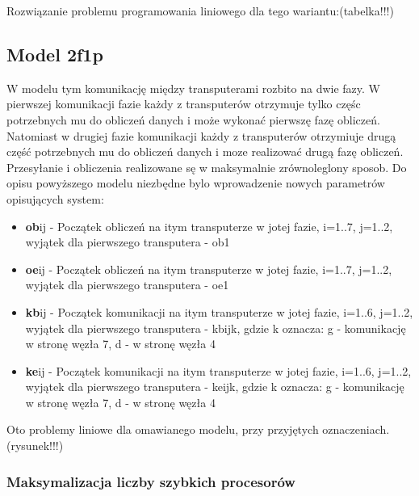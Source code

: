\documentclass[a4paper,11pt, titlepage]{article}
\begin{document}
Rozwiązanie problemu programowania liniowego dla tego wariantu:(tabelka!!!)

\subsection{Model 2f1p}
W modelu tym komunikację między transputerami rozbito na dwie fazy. W pierwszej komunikacji fazie każdy z transputerów otrzymuje tylko częśc potrzebnych mu do obliczeń danych i może wykonać pierwszę fazę obliczeń. Natomiast w drugiej fazie komunikacji każdy z transputerów otrzymiuje drugą część potrzebnych mu do obliczeń danych i moze realizować drugą fazę obliczeń. Przesyłanie i obliczenia realizowane sę w maksymalnie zrównoleglony sposob. 
Do opisu powyższego modelu niezbędne bylo wprowadzenie nowych parametrów opisujących system:
\begin{itemize}
\item \textbf{ob}ij - Początek obliczeń na itym transputerze w jotej fazie, i=1..7, j=1..2, wyjątek dla pierwszego transputera - ob1
\item \textbf{oe}ij - Początek obliczeń na itym transputerze w jotej fazie, i=1..7, j=1..2, wyjątek dla pierwszego transputera - oe1
\item \textbf{kb}ij - Początek komunikacji na itym transputerze w jotej fazie, i=1..6, j=1..2, wyjątek dla pierwszego transputera - kbijk, gdzie k oznacza: g - komunikację w stronę węzła 7, d - w stronę węzła 4
\item \textbf{ke}ij - Początek komunikacji na itym transputerze w jotej fazie, i=1..6, j=1..2, wyjątek dla pierwszego transputera - keijk, gdzie k oznacza: g - komunikację w stronę węzła 7, d - w stronę węzła 4 
\end{itemize}
Oto problemy liniowe dla omawianego modelu, przy przyjętych oznaczeniach.(rysunek!!!)
\subsubsection{Maksymalizacja liczby szybkich procesorów}
\end{document}
